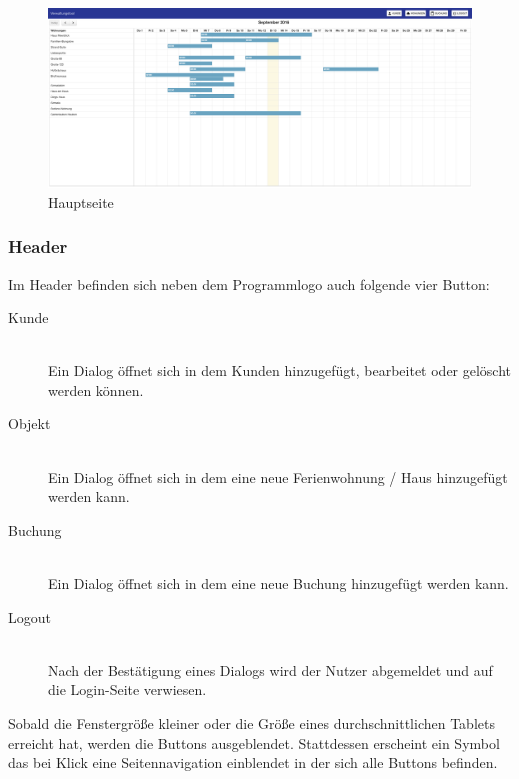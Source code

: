 \begin{figure}[H]
\centering\includegraphics[width=1\textwidth]{images/frontend_mainpage.png}
\caption{Hauptseite}
\label{frontend_mainpage}
\end{figure}

\subsubsection{Header}
Im Header befinden sich neben dem Programmlogo auch folgende vier Button:


\begin{description}
\item[Kunde]\hfill \\
Ein Dialog öffnet sich in dem Kunden hinzugefügt, bearbeitet oder gelöscht werden können.
\item[Objekt]\hfill \\ 
Ein Dialog öffnet sich in dem eine neue Ferienwohnung / Haus hinzugefügt werden kann. 
\item[Buchung]\hfill \\ 
Ein Dialog öffnet sich in dem eine neue Buchung hinzugefügt werden kann. 
\item[Logout]\hfill \\ 
Nach der Bestätigung eines Dialogs wird der Nutzer abgemeldet und auf die Login-Seite verwiesen. 
\end{description}

Sobald die Fenstergröße kleiner oder die Größe eines durchschnittlichen Tablets erreicht hat, werden die Buttons ausgeblendet. Stattdessen erscheint ein Symbol das bei Klick eine Seitennavigation einblendet in der sich alle Buttons befinden.

